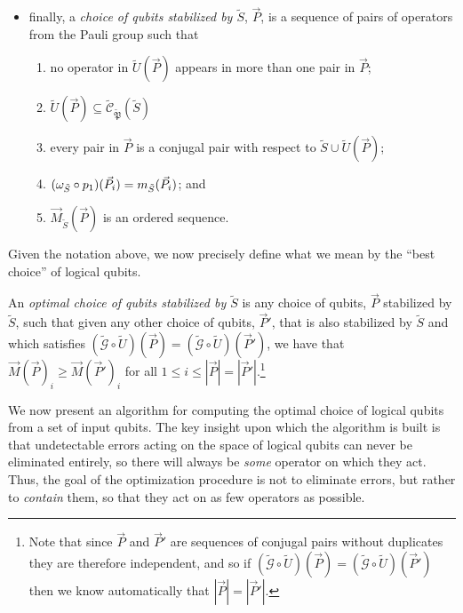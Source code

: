 \documentclass[twocolumn,showpacs,preprintnumbers,amsmath,amssymb,nofootinbib,pra,floatfix]{revtex4-1}
\newenvironment{definition}[1][Definition]{\begin{trivlist}
\item[\hskip \labelsep {\bfseries #1}]}{\end{trivlist}}
\newcommand{\lst}{\vec}
\newcommand{\set}{\tilde}
\newcommand{\genfun}{\tilde{\mathcal{G}}}
\newcommand{\pauligroup}{{\set{\mathfrak{P}}}}
\newcommand{\centralizer}{\set{\mathcal{C}}}
\begin{document}
\begin{definition}
\begin{itemize}
\item finally, a \emph{choice of qubits stabilized by $\set S$}, $\lst P$, is a sequence of pairs of operators from the Pauli group such that 
\begin{enumerate}
\item no operator in $\set U(\lst P)$ appears in more than one pair in $\lst P$;
\item $\set U(\lst P)\subseteq \centralizer_\pauligroup(\set S)$
\item every pair in $\lst P$ is a conjugal pair with respect to $\set S \cup \set U(\lst P)$;
\item $(\om_{\set S}\circ p_1)(\lst P_i)=m_{\set S}(\lst P_i)$; and
\item $\lst M_{\set S}(\lst P)$ is an ordered sequence.
\end{enumerate}
\end{itemize}

\end{definition}
Given the notation above, we now precisely define what we mean by the ``best choice'' of logical qubits.

\begin{definition}
An \emph{optimal choice of qubits stabilized by $\set S$} is any choice of qubits, $\lst P$ stabilized by $\set S$, such that given any other choice of qubits, $\lst P'$, that is also stabilized by $\set S$ and which satisfies $(\genfun\circ \set U)(\lst P)=(\genfun\circ \set U)(\lst P')$, we have that $\lst M(\lst P)_i \ge \lst M(\lst P')_i$ for all $1\le i \le |\lst P|=|\lst P'|$.\footnote{Note that since $\lst P$ and $\lst P'$ are sequences of conjugal pairs without duplicates they are therefore independent, and so if $(\genfun\circ \set U)(\lst P)=(\genfun\circ \set U)(\lst P')$ then we know automatically that $|\lst P|=|\lst P'|$.}
\end{definition}
We now present an algorithm for computing the optimal choice of logical qubits from a set of input qubits.  The key insight upon which the algorithm is built is that undetectable errors acting on the space of logical qubits can never be eliminated entirely, so there will always be \emph{some} operator on which they act.  Thus, the goal of the optimization procedure is not to eliminate errors, but rather to \emph{contain} them, so that they act on as few operators as possible.
\end{document}
